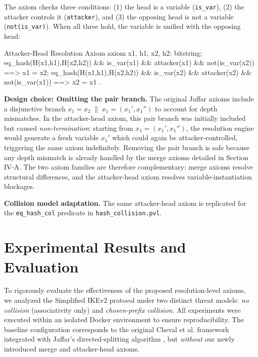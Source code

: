 \documentclass[journal]{IEEEtran}
\begin{document}
The axiom checks three conditions: (1) the head is a variable (\texttt{is\_var}), (2) the attacker controls it (\texttt{attacker}), and (3) the opposing head is not a variable (\texttt{not(is\_var)}). When all three hold, the variable is unified with the opposing head:

\begin{proverifcode}{Attacker-Head Resolution Axiom}
axiom x1, h1, x2, h2: bitstring;
  eq_hash(H(x1,h1),H(x2,h2))
    && is_var(x1) && attacker(x1) && not(is_var(x2))
    ==> x1 = x2;
  eq_hash(H(x1,h1),H(x2,h2))
    && is_var(x2) && attacker(x2) && not(is_var(x1))
    ==> x2 = x1
.
\end{proverifcode}

\textbf{Design choice: Omitting the pair branch.} The original Jaffar axioms include a disjunctive branch $x_1 = x_2 \;\|\; x_1 = (x_1', x_1'')$ to account for depth mismatches. In the attacker-head axiom, this pair branch was initially included but caused \emph{non-termination}: starting from $x_1 = (x_1', x_1'')$, the resolution engine would generate a fresh variable $x_1'$ which could again be attacker-controlled, triggering the same axiom indefinitely. Removing the pair branch is safe because any depth mismatch is already handled by the merge axioms detailed in Section IV-A. The two axiom families are therefore complementary: merge axioms resolve structural differences, and the attacker-head axiom resolves variable-instantiation blockages.

\textbf{Collision model adaptation.} The same attacker-head axiom is replicated for the \texttt{eq\_hash\_col} predicate in \texttt{hash\_collision.pvl}.


\section{Experimental Results and Evaluation}

To rigorously evaluate the effectiveness of the proposed resolution-level axioms, we analyzed the Simplified IKEv2 protocol under two distinct threat models: \emph{no collision} (associativity only) and \emph{chosen-prefix collision}. All experiments were executed within an isolated Docker environment  \cite{our_docker} to ensure reproducibility. The baseline configuration corresponds to the original Cheval et al. framework \cite{cheval2023hash} integrated with Jaffar's directed-splitting algorithm \cite{jaffar1990word}, but \emph{without} our newly introduced merge and attacker-head axioms.
\end{document}
